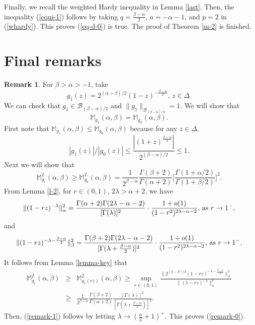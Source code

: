 \documentclass[10pt]{amsart}
\theoremstyle{definition}    %
\newtheorem{remark}[theorem]{Remark}
\numberwithin{equation}{section}
\begin{document}
Finally, we recall the weighted Hardy inequality in Lemma \ref{last}. Then, the inequality (\ref{equi-1}) follows by taking $q=\frac{\beta-\alpha}{2}$, $a=-\alpha-1$, and $p=2$ in (\ref{whardy}). This proves (\ref{eq-d-0}) is true.  The proof of Theorem \ref{m-2} is finished. 
\section{{\bf Final remarks}}
\begin{remark} 
For $\beta>\alpha>-1$, take $$g_1(z)=2^{(\alpha-\beta)/2} (1-z)^{-\frac{\beta-\alpha}{2}}, \,z\in \Delta.$$
We can check that $g_1\in \mathcal{B}_{(\beta-\alpha)/2}$ and $\|g_1\|_{\mathcal{B}_{(\beta-\alpha)/2}}=1.$ We will show that 
\begin{equation}\label{remark-0}
{\mathbb{M}}_{g_1}(\alpha,\beta)=\mathbb{M}_{g_0}(\alpha,\beta).
\end{equation}
First note that $\mathbb{M}_{g_1}(\alpha,\beta)\leq\mathbb{M}_{g_0}(\alpha,\beta)$ because for any $z\in \Delta,$ 
$$|g_{1}(z)|/|g_0(z)|\leq \frac{|(1+z)^{\frac{\beta-\alpha}{2}}|}{2^{(\beta-\alpha)/2}}\leq 1.$$
Next we will show that
\begin{equation}\label{remark-1}\mathbb{M}_{g_1}^2(\alpha,\beta)\geq \mathbb{M}_{g_0}^2(\alpha,\beta)=\frac{1}{2^{\beta-\alpha}}\frac{\Gamma(\beta+2)}{\Gamma(\alpha+2)}\Big[\frac{\Gamma(1+\alpha/2)}{\Gamma(1+\beta/2)}\Big]^2.\end{equation}
From Lemma \ref{l-2}, for $r\in (0,1)$, $2\lambda> \alpha+2$, we have 
\begin{equation} 
 \|{(1-rz)^{-\lambda}}\|_{\alpha}^2=\frac{\Gamma(\alpha+2)\Gamma(2\lambda-\alpha-2)}{[\Gamma(\lambda)]^2}\cdot\frac{1+{o}(1)}{(1-r^2)^{2\lambda-\alpha-2}},\, {\textup{as}}\,\, r\rightarrow 1^{-}, \nonumber 
 \end{equation}
 and \begin{equation} 
 \|{(1-rz)^{-\lambda-\frac{\beta-\alpha}{2}}}\|_{\beta}^2=\frac{\Gamma(\beta+2)\Gamma(2\lambda-\alpha-2)}{[\Gamma(\lambda+\frac{\beta-\alpha}{2})]^2}\cdot\frac{1+{o}(1)}{(1-r^2)^{2\lambda-\alpha-2}},\, {\textup{as}}\,\, r\rightarrow 1^{-}.\nonumber 
 \end{equation}
It follows from Lemma \ref{lemma-key} that  
\begin{eqnarray}
\mathbb{M}_{g_1}^2(\alpha, \beta)&\geq&\mathbb{M}_{g_1(rz)}^2(\alpha, \beta)\geq \sup\limits_{r\in (0,1)}\frac{ \|2^{(\alpha-\beta)/2}{(1-rz)^{-\lambda-\frac{\beta-\alpha}{2}}}\|_{\beta}^2}{ \|{(1-rz)^{-\lambda}}\|_{\alpha}^2}\nonumber \\
&\geq& \frac{1}{2^{\beta-\alpha}}\frac{\Gamma(\beta+2)}{\Gamma(\alpha+2)}\frac{[\Gamma(\lambda)]^2}{[\Gamma(\lambda+\frac{\beta-\alpha}{2})]^2}. \nonumber\end{eqnarray} 
Then, (\ref{remark-1}) follows by letting $\lambda\to (\frac{\alpha}{2}+1)^{+}$. This proves (\ref{remark-0}).
\end{remark}
\end{document}
